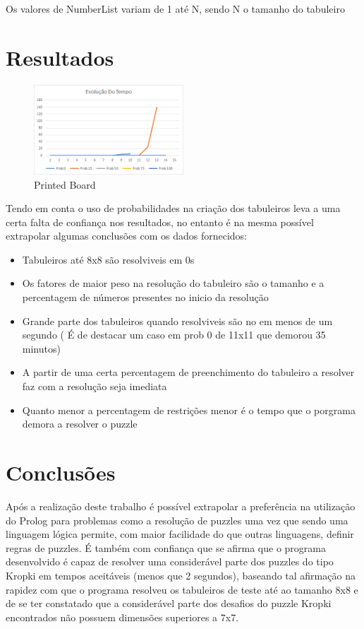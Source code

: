 \documentclass[runningheads,a4paper]{llncs}
\begin{document}
Os valores de NumberList variam de 1 até N, sendo N o tamanho do tabuleiro
\pagebreak
\section{Resultados}
\begin{figure}[!ht]
\centering
\includegraphics[width=0.5\textwidth]{time}
\caption{Printed Board}
\end{figure}
Tendo em conta o uso de probabilidades na criação dos tabuleiros leva a uma certa falta de confiança nos resultados, no entanto é na mesma possível extrapolar algumas conclusões com os dados fornecidos:
\begin{itemize}
\item Tabuleiros até 8x8 são resolviveis em 0s
\item Os fatores de maior peso na resolução do tabuleiro são o tamanho e a percentagem de números presentes no inicio da resolução
\item Grande parte dos tabuleiros quando resolviveis são no em menos de um segundo ( É de destacar um caso em prob 0 de 11x11 que demorou 35 minutos)
\item A partir de uma certa percentagem de preenchimento do tabuleiro a resolver faz com a resolução seja imediata 
\item  Quanto menor a percentagem de restrições menor é o tempo que o porgrama demora a resolver o puzzle
\end{itemize}
\section{Conclusões}

Após a realização deste trabalho é possível extrapolar a preferência na utilização do Prolog para problemas como a resolução de puzzles uma vez que sendo uma linguagem lógica permite, com maior facilidade do que outras linguagens, definir regras de puzzles. É também com confiança que se afirma que o programa desenvolvido é capaz de resolver uma considerável parte dos puzzles do tipo Kropki em tempos aceitáveis (menos que 2 segundos), baseando tal afirmação na rapidez com que o programa resolveu os tabuleiros de teste até ao tamanho 8x8 e de se ter constatado que a considerável parte dos desafios do puzzle Kropki encontrados não possuem dimensões superiores a 7x7.
\end{document}
